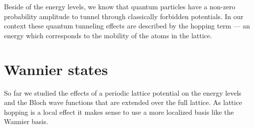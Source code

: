 Beside of the energy levels, we know that quantum particles have a non-zero
probability amplitude to tunnel through classically forbidden potentials. In
our context these quantum tunneling effects are described by the hopping term
--- an energy which corresponds to the mobility of the atoms in the lattice.

\section{Wannier states}

So far we studied the effects of a periodic lattice potential on the energy
levels and the Bloch wave functions that are extended over the full lattice.
As lattice hopping is a local effect it makes sense to use a more localized
basis like the Wannier basis.

